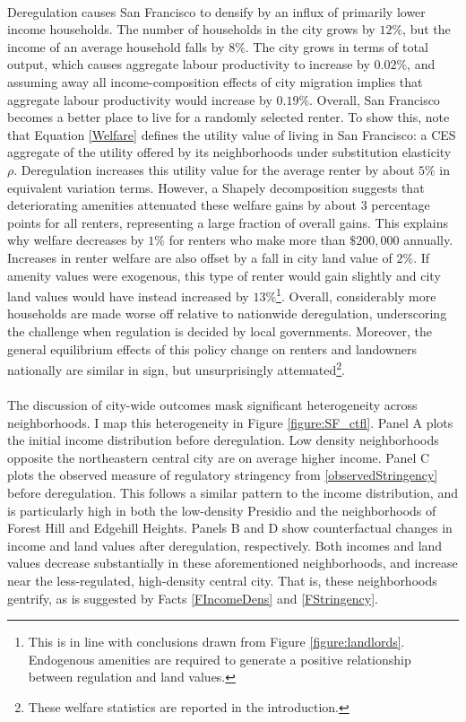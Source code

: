 \documentclass[12pt]{article}
\begin{document}
\paragraph*{}
 Deregulation causes San Francisco to densify by an influx of primarily lower income households. The number of households in the city grows by $12 \%$, but the income of an average household falls by $8 \%$.  The city grows in terms of total output, which causes aggregate labour productivity to increase by $0.02\%$, and assuming away all income-composition effects of city migration implies that aggregate labour productivity would increase by $0.19\%$. Overall, San Francisco becomes a better place to live for a randomly selected renter. To show this, note that Equation \eqref{Welfare} defines the utility value of living in San Francisco: a CES aggregate of the utility offered by its neighborhoods under substitution elasticity $\rho$. Deregulation increases this utility value for the average renter by about $5 \%$ in equivalent variation terms. However, a Shapely decomposition suggests that deteriorating amenities attenuated these welfare gains by about $3$ percentage points for all renters, representing a large fraction of overall gains. This explains why welfare decreases by $1 \%$ for renters who make more than $\$200,000$ annually. Increases in renter welfare are also offset by a fall in city land value of $2\%$. If amenity values were exogenous, this type of renter would gain slightly and city land values would have instead increased by $13 \%$\footnote{This is in line with conclusions drawn from Figure \ref{figure:landlords}. Endogenous amenities are required to generate a positive relationship between regulation and land values.}. Overall, considerably more households are made worse off relative to nationwide deregulation, underscoring the challenge when regulation is decided by local governments. Moreover, the general equilibrium effects of this policy change on renters and landowners nationally are similar in sign, but unsurprisingly attenuated\footnote{These welfare statistics are reported in the introduction.}.

\paragraph*{}
 The discussion of city-wide outcomes mask significant heterogeneity across neighborhoods. I map this heterogeneity in Figure \ref{figure:SF_ctfl}. Panel A plots the initial income distribution before deregulation. Low density neighborhoods opposite the northeastern central city are on average higher income. Panel C plots the observed measure of regulatory stringency from \eqref{observedStringency} before deregulation. This follows a similar pattern to the income distribution, and is particularly high in both the low-density Presidio and the neighborhoods of Forest Hill and Edgehill Heights. Panels B and D show counterfactual changes in income and land values after deregulation, respectively. Both incomes and land values decrease substantially in these aforementioned neighborhoods, and increase near the less-regulated, high-density central city. That is, these neighborhoods gentrify, as is suggested by Facts \ref{FIncomeDens} and \ref{FStringency}. 
 
\end{document}
